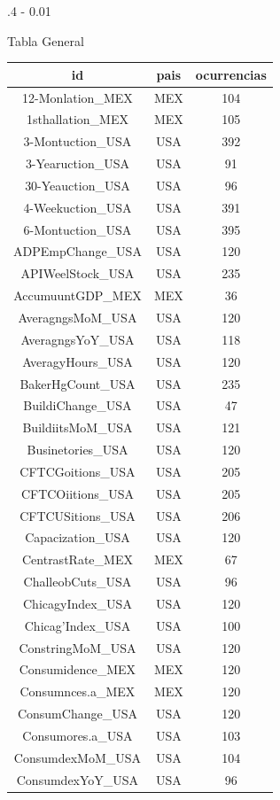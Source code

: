 \documentclass{iteraposter}\usepackage[]{graphicx}\usepackage[]{color}
\begin{document}
\begin{frame}
\begin{columns}[onlytextwidth]
\begin{column}{.4 \textwidth - 0.01\textwidth}
\begin{block}{Tabla General}
\begin{tabular}{c|c|c}
\hline
id & pais & ocurrencias\\
\hline
12-Monlation\_MEX & MEX & 104\\
\hline
1sthallation\_MEX & MEX & 105\\
\hline
3-Montuction\_USA & USA & 392\\
\hline
3-Yearuction\_USA & USA & 91\\
\hline
30-Yeauction\_USA & USA & 96\\
\hline
4-Weekuction\_USA & USA & 391\\
\hline
6-Montuction\_USA & USA & 395\\
\hline
ADPEmpChange\_USA & USA & 120\\
\hline
APIWeelStock\_USA & USA & 235\\
\hline
AccumuuntGDP\_MEX & MEX & 36\\
\hline
AveragngsMoM\_USA & USA & 120\\
\hline
AveragngsYoY\_USA & USA & 118\\
\hline
AveragyHours\_USA & USA & 120\\
\hline
BakerHgCount\_USA & USA & 235\\
\hline
BuildiChange\_USA & USA & 47\\
\hline
BuildiitsMoM\_USA & USA & 121\\
\hline
Businetories\_USA & USA & 120\\
\hline
CFTCGoitions\_USA & USA & 205\\
\hline
CFTCOiitions\_USA & USA & 205\\
\hline
CFTCUSitions\_USA & USA & 206\\
\hline
Capacization\_USA & USA & 120\\
\hline
CentrastRate\_MEX & MEX & 67\\
\hline
ChalleobCuts\_USA & USA & 96\\
\hline
ChicagyIndex\_USA & USA & 120\\
\hline
Chicag'Index\_USA & USA & 100\\
\hline
ConstringMoM\_USA & USA & 120\\
\hline
Consumidence\_MEX & MEX & 120\\
\hline
Consumnces.a\_MEX & MEX & 120\\
\hline
ConsumChange\_USA & USA & 120\\
\hline
Consumores.a\_USA & USA & 103\\
\hline
ConsumdexMoM\_USA & USA & 104\\
\hline
ConsumdexYoY\_USA & USA & 96\\

\end{tabular}
\end{block}
\end{column}
\end{columns}
\end{frame}
\end{document}
